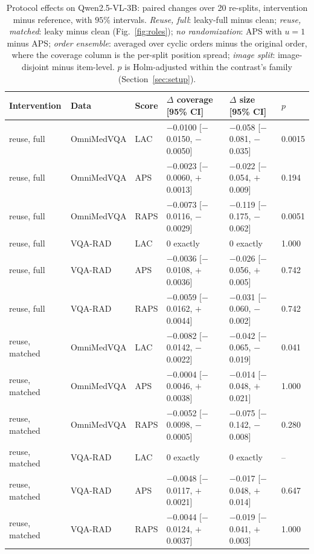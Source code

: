 \documentclass[a4paper,conference]{IEEEtran}
\begin{document}
\begin{table}[tb]
\caption{Protocol effects on Qwen2.5-VL-3B: paired changes over 20 re-splits,
intervention minus reference, with $95\%$ intervals. \emph{Reuse, full}:
leaky-full minus clean; \emph{reuse, matched}: leaky minus clean
(Fig.~\ref{fig:roles}); \emph{no randomization}: APS with $u=1$ minus APS;
\emph{order ensemble}: averaged over cyclic orders minus the original order,
where the coverage column is the per-split position spread; \emph{image split}:
image-disjoint minus item-level. $p$ is Holm-adjusted within the contrast's
family (Section~\ref{sec:setup}).}
\label{tab:effects}
\centering
\footnotesize
\begin{tabular}{llllll}
\toprule
Intervention & Data & Score & $\Delta$ coverage [95\% CI] & $\Delta$ size [95\% CI] & $p$ \\
\midrule
reuse, full & OmniMedVQA & LAC & $-$0.0100 [$-$0.0150, $-$0.0050] & $-$0.058 [$-$0.081, $-$0.035] & 0.0015 \\
reuse, full & OmniMedVQA & APS & $-$0.0023 [$-$0.0060, $+$0.0013] & $-$0.022 [$-$0.054, $+$0.009] & 0.194 \\
reuse, full & OmniMedVQA & RAPS & $-$0.0073 [$-$0.0116, $-$0.0029] & $-$0.119 [$-$0.175, $-$0.062] & 0.0051 \\
reuse, full & VQA-RAD & LAC & 0 exactly & 0 exactly & 1.000 \\
reuse, full & VQA-RAD & APS & $-$0.0036 [$-$0.0108, $+$0.0036] & $-$0.026 [$-$0.056, $+$0.005] & 0.742 \\
reuse, full & VQA-RAD & RAPS & $-$0.0059 [$-$0.0162, $+$0.0044] & $-$0.031 [$-$0.060, $-$0.002] & 0.742 \\
\midrule
reuse, matched & OmniMedVQA & LAC & $-$0.0082 [$-$0.0142, $-$0.0022] & $-$0.042 [$-$0.065, $-$0.019] & 0.041 \\
reuse, matched & OmniMedVQA & APS & $-$0.0004 [$-$0.0046, $+$0.0038] & $-$0.014 [$-$0.048, $+$0.021] & 1.000 \\
reuse, matched & OmniMedVQA & RAPS & $-$0.0052 [$-$0.0098, $-$0.0005] & $-$0.075 [$-$0.142, $-$0.008] & 0.280 \\
reuse, matched & VQA-RAD & LAC & 0 exactly & 0 exactly & -- \\
reuse, matched & VQA-RAD & APS & $-$0.0048 [$-$0.0117, $+$0.0021] & $-$0.017 [$-$0.048, $+$0.014] & 0.647 \\
reuse, matched & VQA-RAD & RAPS & $-$0.0044 [$-$0.0124, $+$0.0037] & $-$0.019 [$-$0.041, $+$0.003] & 1.000 \\
\midrule

\end{tabular}
\end{table}
\end{document}
